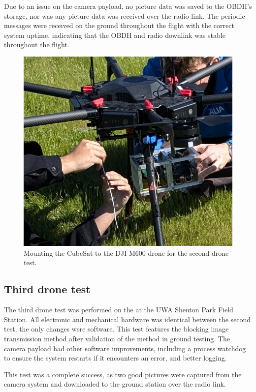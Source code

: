 \documentclass[]{report}
\begin{document}
Due to an issue on the camera payload, no picture data was saved to the OBDH's storage, nor was any picture data was received over the radio link. The periodic messages were received on the ground throughout the flight with the correct system uptime, indicating that the OBDH and radio downlink was stable throughout the flight.

\begin{figure}[H]
  \centering
  \includegraphics[width=\linewidth]{images/2nd_drone_test_setup.jpg}
  \caption{Mounting the CubeSat to the DJI M600 drone for the second drone test.}
  \label{fig:mounting-cubesat-drone-2}
\end{figure}

\subsection{Third drone test}

The third drone test was performed on the  at the UWA Shenton Park Field Station. All electronic and mechanical hardware was identical between the second test, the only changes were software. This test features the blocking image transmission method after validation of the method in ground testing. The camera payload had other software improvements, including a process watchdog to ensure the system restarts if it encounters an error, and better logging.

This test was a complete success, as two good pictures were captured from the camera system and downloaded to the ground station over the radio link.
\end{document}
